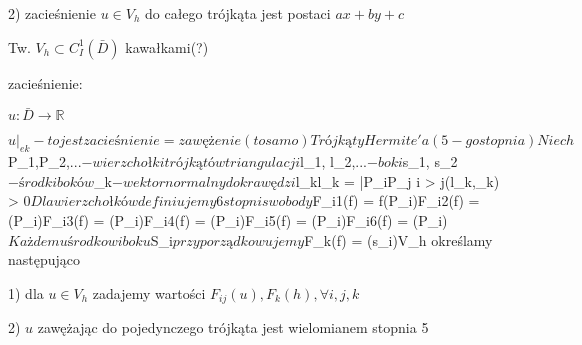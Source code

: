 2) zacieśnienie $u \in V_h$ do całego trójkąta jest postaci $ax+by+c$

Tw. $V_h \subset C_I^1(\bar{D})$ kawałkami(?)

zacieśnienie:

$u: \bar{D} \rightarrow \mathbb{R}$

$u|_{ek} - to jest zacieśnienie = zawężenie (to samo)

Trójkąty Hermite'a (5-go stopnia)

Niech $P_1,P_2,...$ - wierzchołki trójkątów triangulacji

$l_1, l_2,...$ - boki

$s_1, s_2$ - środki boków

$\eta _k$ - wektor normalny do krawędzi $l_k$

$l_k = \bar{P_iP_j} i > j$

$(l_k,\eta_k) > 0$

Dla wierzchołków definiujemy 6 stopni swobody

$F_{i1}(f) = f(P_i)$

$F_{i2}(f) = (P_i)$

$F_{i3}(f) = (P_i)$

$F_{i4}(f) = (P_i)$

$F_{i5}(f) = (P_i)$

$F_{i6}(f) = (P_i)$

Każdemu środkowi boku $S_i$ przyporządkowujemy

$F_k(f) = (s_i)$

$V_h określamy następująco

1) dla $u \in V_h$ zadajemy wartości $F_{ij}(u), F_k(h), \forall i,j,k$

2) $u$ zawężając do pojedynczego trójkąta jest wielomianem stopnia 5